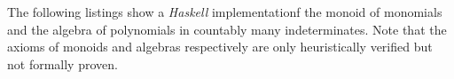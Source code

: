 The following listings show a \emph{Haskell} implementationf the monoid of
monomials and the algebra of polynomials in countably many indeterminates. Note
that the axioms of monoids and algebras respectively are only heuristically
verified but not formally proven.





